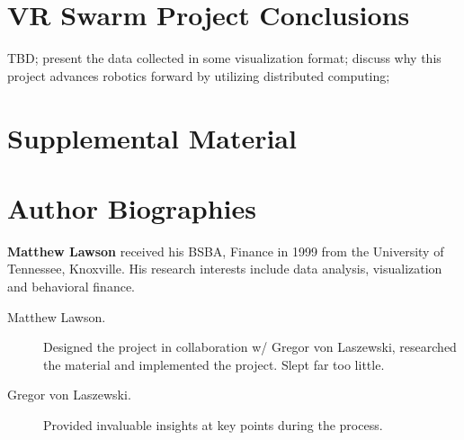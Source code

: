 \documentclass[9pt,twocolumn,twoside]{../../styles/osajnl}
\begin{document}
\section{VR Swarm Project Conclusions}
TBD; present the data collected in some visualization format; discuss why this project advances robotics forward by utilizing distributed computing;

\section{Supplemental Material}



 
\section*{Author Biographies}
\begingroup
\setlength\intextsep{0pt}
\begin{minipage}[t][3.2cm][t]{1.0\columnwidth} %
  \noindent
  {\bfseries Matthew Lawson} received his BSBA, Finance in 1999 from
  the University of Tennessee, Knoxville. His research interests include
  data analysis, visualization and behavioral finance.
\end{minipage}
\endgroup

\appendix
\begin{description}

\item[Matthew Lawson.] Designed the project in collaboration w/ Gregor von Laszewski, researched the material and implemented the project.  Slept far too little.

\item[Gregor von Laszewski.] Provided invaluable insights at key points during the process.

\end{description}
\end{document}
